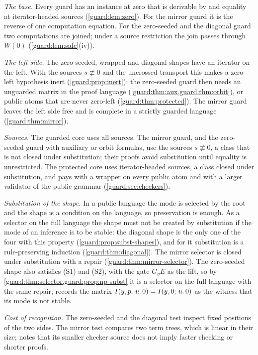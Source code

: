 \emph{The base.}  Every guard has an instance at zero that is derivable by
 and equality at iterator-headed sources
(\cref{guard:lem:zero}).  For the mirror guard it is the reverse of one
computation equation.  For the zero-seeded and the diagonal guard two
computations are joined; under a source restriction the join passes through
$W(0)$ (\cref{guard:lem:safe}(iv)).

\emph{The left side.}  The zero-seeded, wrapped and diagonal shapes have an
iterator on the left.  With the sources $s\not\equiv 0$ and the uncrossed
transport this makes a zero-left hypothesis inert
(\cref{guard:prop:inert}): the zero-seeded guard then needs an unguarded
matrix in the proof language (\cref{guard:thm:aux,guard:thm:orbit}), or
public atoms that are never zero-left (\cref{guard:thm:protected}).  The
mirror guard leaves the left side free and is complete in a strictly
guarded language (\cref{guard:thm:mirror}).

\emph{Sources.}  The guarded core uses all sources.  The mirror guard, and
the zero-seeded guard with auxiliary or orbit formulas, use the sources
$s\not\equiv 0$, a class that is not closed under substitution; their
proofs avoid substitution until equality is unrestricted.  The protected
core uses iterator-headed sources, a class closed under substitution, and
pays with a wrapper on every public atom and with a larger validator of the
public grammar (\cref{guard:sec:checkers}).

\emph{Substitution of the shape.}  In a public language the mode is
selected by the root and the shape is a condition on the language, so
preservation is enough.  As a selector on the full language the shape must
not be created by substitution if the mode of an inference is to be stable:
the diagonal shape is the only one of the four with this property
(\cref{guard:prop:subst-shapes}), and for it substitution is a
rule-preserving induction (\cref{guard:thm:diagonal}).  The mirror selector
is closed under substitution with a repair
(\cref{guard:thm:mirror-selector}).  The zero-seeded shape also satisfies
\textup{(S1)} and \textup{(S2)}, with the gate $G_yE$ as the lift, so by
\cref{guard:thm:selector,guard:prop:np-subst} it is a selector on the full
language with the same repair;  records the matrix
$I(y,p;\,u.\,0)=I(y,0;\,u.\,0)$ as the witness that its mode is not
stable.

\emph{Cost of recognition.}  The zero-seeded and the diagonal test inspect
fixed positions of the two sides.  The mirror test compares two term trees,
which is linear in their size;  notes that its smaller
checker source does not imply faster checking or shorter proofs.

